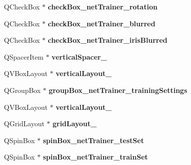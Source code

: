 \begin{DoxyCompactItemize}
\item 
\mbox{\label{class_ui___main_window_a02e2fb5fe5d9e1f0088f6697bcd7877a}} 
Q\+Check\+Box $\ast$ {\bfseries check\+Box\+\_\+net\+Trainer\+\_\+rotation}
\item 
\mbox{\label{class_ui___main_window_a9fd5ff17f819ef3e78eee7cdffe0190f}} 
Q\+Check\+Box $\ast$ {\bfseries check\+Box\+\_\+net\+Trainer\+\_\+blurred}
\item 
\mbox{\label{class_ui___main_window_aea6abd79826f3e471a6cbbf9408c90f9}} 
Q\+Check\+Box $\ast$ {\bfseries check\+Box\+\_\+net\+Trainer\+\_\+iris\+Blurred}
\item 
\mbox{\label{class_ui___main_window_ae6aa3f2ea7a5ff106015aa6ef9f24529}} 
Q\+Spacer\+Item $\ast$ {\bfseries vertical\+Spacer\+\_}
\item 
\mbox{\label{class_ui___main_window_a45cf7ed92fd30c3af56918cb4ff88893}} 
Q\+V\+Box\+Layout $\ast$ {\bfseries vertical\+Layout\+\_}
\item 
\mbox{\label{class_ui___main_window_a8b0bdd9dc4d569f345c7d44e3abc192d}} 
Q\+Group\+Box $\ast$ {\bfseries group\+Box\+\_\+net\+Trainer\+\_\+training\+Settings}
\item 
\mbox{\label{class_ui___main_window_a1dd03599a38ab88cc01201488e5786b4}} 
Q\+V\+Box\+Layout $\ast$ {\bfseries vertical\+Layout\+\_}
\item 
\mbox{\label{class_ui___main_window_a6b2a0c5f7e8ff2a87134908dd770d2d2}} 
Q\+Grid\+Layout $\ast$ {\bfseries grid\+Layout\+\_}
\item 
\mbox{\label{class_ui___main_window_acbee9a44d02a063a0a924c2fdcfd9ed0}} 
Q\+Spin\+Box $\ast$ {\bfseries spin\+Box\+\_\+net\+Trainer\+\_\+test\+Set}
\item 
\mbox{\label{class_ui___main_window_a885ab8781354beb1a943f4cceff25108}} 
Q\+Spin\+Box $\ast$ {\bfseries spin\+Box\+\_\+net\+Trainer\+\_\+train\+Set}

\end{DoxyCompactItemize}
